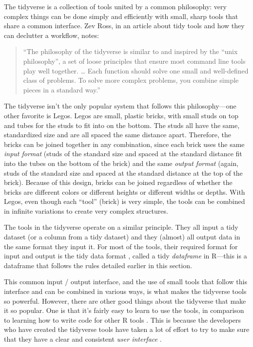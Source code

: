 \documentclass[]{tufte-book}
\begin{document}
The tidyverse is a collection of tools united by a common philosophy: very complex
things can be done simply and efficiently with small, sharp tools that share a
common interface. Zev Ross, in an article about tidy tools and how they can
declutter a workflow, notes:

\begin{quote}
``The philosophy of the tidyverse is similar to
and inspired by the ``unix philosophy'', a set of loose principles that ensure
most command line tools play well together. \ldots{} Each function should solve one
small and well-defined class of problems. To solve more complex problems, you
combine simple pieces in a standard way.'' \citep{ross2017declutter}
\end{quote}

The tidyverse isn't the only popular system that follows this
philosophy---one other favorite is Legos. Legos are small, plastic bricks, with
small studs on top and tubes for the studs to fit into on the bottom. The studs
all have the same, standardized size and are all spaced the same distance apart.
Therefore, the bricks can be joined together in any combination, since each
brick uses the same \emph{input format} (studs of the standard size and spaced at the
standard distance fit into the tubes on the bottom of the brick) and the same
\emph{output format} (again, studs of the standard size and spaced at the standard
distance at the top of the brick). Because of this design, bricks can be joined
regardless of whether the bricks are different colors or different heights or
different widths or depths. With Legos, even though each ``tool'' (brick) is very
simple, the tools can be combined in infinite variations to create very complex
structures.

The tools in the tidyverse operate on a similar principle. They all input a
tidy dataset (or a column from a tidy dataset) and they (almost) all output data
in the same format they input it. For most of the tools, their required format
for input and output is the tidy data format \citep{wickham2014tidy}, called a tidy
\emph{dataframe} in R---this is a dataframe that follows the rules detailed earlier
in this section.

This common input / output interface, and the use of small tools that follow
this interface and can be combined in various ways, is what makes the tidyverse
tools so powerful. However, there are other good things about the tidyverse that
make it so popular. One is that it's fairly easy to learn to use the tools, in
comparison to learning how to write code for other R tools \citep{robinson2017teach, peng2018teaching}. This is because the developers who have created the
tidyverse tools have taken a lot of effort to try to make sure that they have a
clear and consistent \emph{user interface} \citep{wickham2017tidy, bryan2017data}.
\end{document}
